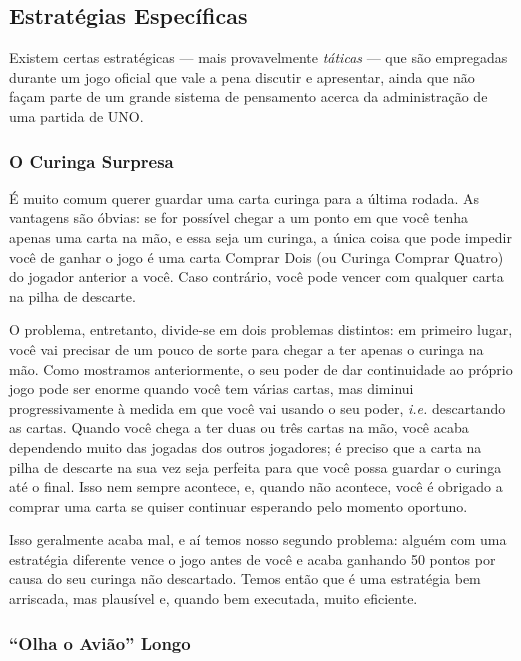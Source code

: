 \subsection{Estratégias Específicas}

Existem certas estratégicas --- mais provavelmente \textit{táticas} --- que são empregadas durante um jogo oficial que vale a pena discutir e apresentar, ainda que não façam parte de um grande sistema de pensamento acerca da administração de uma partida de UNO.

\subsubsection{O Curinga Surpresa}

É muito comum querer guardar uma carta curinga para a última rodada. As vantagens são óbvias: se for possível chegar a um ponto em que você tenha apenas uma carta na mão, e essa seja um curinga, a única coisa que pode impedir você de ganhar o jogo é uma carta Comprar Dois (ou Curinga Comprar Quatro) do jogador anterior a você. Caso contrário, você pode vencer com qualquer carta na pilha de descarte.

O problema, entretanto, divide-se em dois problemas distintos: em primeiro lugar, você vai precisar de um pouco de sorte para chegar a ter apenas o curinga na mão. Como mostramos anteriormente, o seu poder de dar continuidade ao próprio jogo pode ser enorme quando você tem várias cartas, mas diminui progressivamente à medida em que você vai usando o seu poder, \textit{i.e.} descartando as cartas. Quando você chega a ter duas ou três cartas na mão, você acaba dependendo muito das jogadas dos outros jogadores; é preciso que a carta na pilha de descarte na sua vez seja perfeita para que você possa guardar o curinga até o final. Isso nem sempre acontece, e, quando não acontece, você é obrigado a comprar uma carta se quiser continuar esperando pelo momento oportuno.

Isso geralmente acaba mal, e aí temos nosso segundo problema: alguém com uma estratégia diferente vence o jogo antes de você e acaba ganhando 50 pontos por causa do seu curinga não descartado. Temos então que é uma estratégia bem arriscada, mas plausível e, quando bem executada, muito eficiente.

\subsubsection{``Olha o Avião'' Longo}


